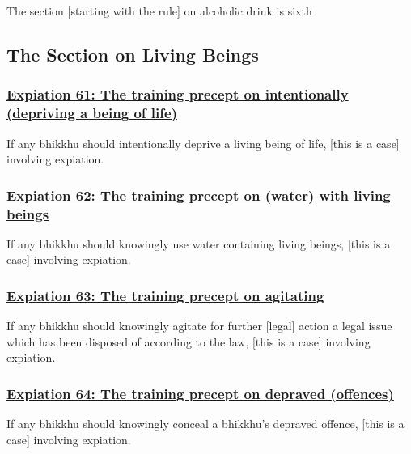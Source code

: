 \begin{center}
	The section [starting with the rule] on alcoholic drink is sixth
\end{center}



\setsubsecheadstyle{\subsectionFmt}
\subsection{The Section on Living Beings}
\label{exp-vagga7}

\subsubsection*{\hyperref[pac61]{Expiation 61: The training precept on intentionally (depriving a being of life)}}
\label{exp61}
If any bhikkhu should intentionally deprive a living being of life, [this is a case] involving expiation.



\subsubsection*{\hyperref[pac62]{Expiation 62: The training precept on (water) with living beings}}
\label{exp62}
If any bhikkhu should knowingly use water containing living beings, [this is a case] involving expiation.



\subsubsection*{\hyperref[pac63]{Expiation 63: The training precept on agitating}}
\label{exp63}
If any bhikkhu should knowingly agitate for further [legal] action a legal issue which has been disposed of according to the law, [this is a case] involving expiation.



\subsubsection*{\hyperref[pac64]{Expiation 64: The training precept on depraved (offences)}}
\label{exp64}
If any bhikkhu should knowingly conceal a bhikkhu's depraved offence, [this is a case] involving expiation.



